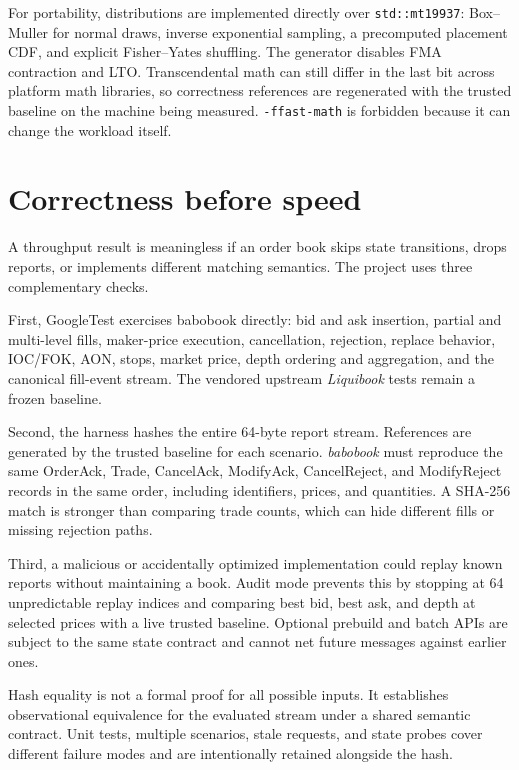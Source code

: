 \documentclass[10pt,twocolumn]{article}
\begin{document}
For portability, distributions are implemented directly over
\texttt{std::mt19937}: Box--Muller for normal draws, inverse exponential
sampling, a precomputed placement CDF, and explicit Fisher--Yates shuffling.
The generator disables FMA contraction and LTO.  Transcendental math can still
differ in the last bit across platform math libraries, so correctness references
are regenerated with the trusted baseline on the machine being measured.
\texttt{-ffast-math} is forbidden because it can change the workload itself.

\section{Correctness before speed}
\label{sec:correctness}

A throughput result is meaningless if an order book skips state transitions,
drops reports, or implements different matching semantics.  The project uses
three complementary checks.

First, GoogleTest exercises babobook directly: bid and ask insertion,
partial and multi-level fills, maker-price execution, cancellation, rejection,
replace behavior, IOC/FOK, AON, stops, market price, depth ordering and
aggregation, and the canonical fill-event stream.  The vendored upstream \textit{Liquibook} tests remain a
frozen baseline.

Second, the harness hashes the entire 64-byte report stream.  References are
generated by the trusted baseline for each scenario.  \textit{babobook} must reproduce
the same OrderAck, Trade, CancelAck, ModifyAck, CancelReject, and ModifyReject
records in the same order, including identifiers, prices, and quantities.  A
SHA-256 match is stronger than comparing trade counts, which can hide different
fills or missing rejection paths.

Third, a malicious or accidentally optimized implementation could replay known reports
without maintaining a book.  Audit mode prevents this by stopping at 64
unpredictable replay indices and comparing best bid, best ask, and depth at
selected prices with a live trusted baseline.  Optional prebuild and batch APIs
are subject to the same state contract and cannot net future messages against
earlier ones.

Hash equality is not a formal proof for all possible inputs.  It establishes
observational equivalence for the evaluated stream under a shared semantic
contract.  Unit tests, multiple scenarios, stale requests, and state probes cover
different failure modes and are intentionally retained alongside the hash.
\end{document}
